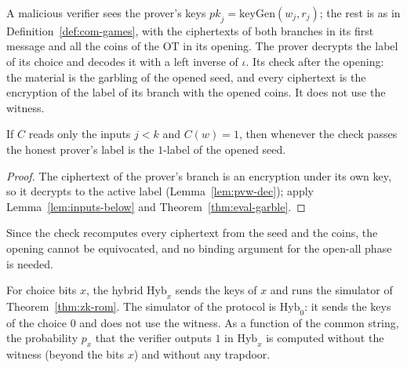 \begin{definition}
  \label{def:pvw-ver}
  \leanok
  A malicious verifier sees the prover's keys $\mathit{pk}_j = \mathrm{keyGen}(w_j, r_j)$; the rest
  is as in Definition~\ref{def:com-games}, with the ciphertexts of both branches in its first
  message and all the coins of the OT in its opening. The prover decrypts the label of its choice
  and decodes it with a left inverse of $\iota$. Its check after the opening: the material is the
  garbling of the opened seed, and every ciphertext is the encryption of the label of its branch
  with the opened coins. It does not use the witness.
\end{definition}

\begin{lemma}
  \label{lem:pvw-check}
  \leanok
  If $C$ reads only the inputs $j < k$ and $C(w) = 1$, then whenever the check passes the honest
  prover's label is the $1$-label of the opened seed.
\end{lemma}

\begin{proof}
  \leanok
  The ciphertext of the prover's branch is an encryption under its own key, so it decrypts to the
  active label (Lemma~\ref{lem:pvw-dec}); apply Lemma~\ref{lem:inputs-below} and
  Theorem~\ref{thm:eval-garble}.
\end{proof}

Since the check recomputes every ciphertext from the seed and the coins, the opening cannot be
equivocated, and no binding argument for the open-all phase \cite[Appendix~A]{JKO13} is needed.

\begin{definition}[Hybrids]
  \label{def:pvw-hyb}
  \leanok
  For choice bits $x$, the hybrid $\mathrm{Hyb}_x$ sends the keys of $x$ and runs the simulator of
  Theorem~\ref{thm:zk-rom}. The simulator of the protocol is $\mathrm{Hyb}_0$: it sends the keys of
  the choice $0$ and does not use the witness. As a function of the common string, the probability
  $p_x$ that the verifier outputs $1$ in $\mathrm{Hyb}_x$ is computed without the witness (beyond
  the bits $x$) and without any trapdoor.
\end{definition}

